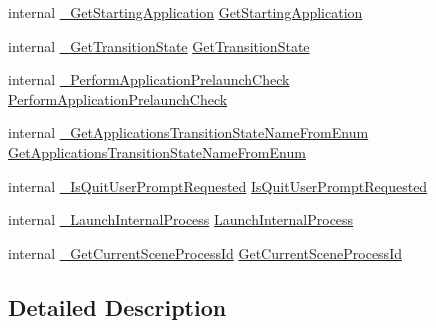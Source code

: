\begin{DoxyCompactItemize}
\item 
internal \mbox{\hyperlink{struct_valve_1_1_v_r_1_1_i_v_r_applications_a1eb7aeb6422c2a09ecf379532597cb05}{\+\_\+\+Get\+Starting\+Application}} \mbox{\hyperlink{struct_valve_1_1_v_r_1_1_i_v_r_applications_abd5f05be0ae3fb969f56ed2c054de4d8}{Get\+Starting\+Application}}
\item 
internal \mbox{\hyperlink{struct_valve_1_1_v_r_1_1_i_v_r_applications_a047619f84dbe4e1fc9faadd800669ac3}{\+\_\+\+Get\+Transition\+State}} \mbox{\hyperlink{struct_valve_1_1_v_r_1_1_i_v_r_applications_a05945f77ee67816eac9b62a4eba9a200}{Get\+Transition\+State}}
\item 
internal \mbox{\hyperlink{struct_valve_1_1_v_r_1_1_i_v_r_applications_af8f1a196897ce93933338eca85476b37}{\+\_\+\+Perform\+Application\+Prelaunch\+Check}} \mbox{\hyperlink{struct_valve_1_1_v_r_1_1_i_v_r_applications_a6692ff62e31050e0e639aedca5dfb342}{Perform\+Application\+Prelaunch\+Check}}
\item 
internal \mbox{\hyperlink{struct_valve_1_1_v_r_1_1_i_v_r_applications_a84090171964167a37149043d7834077b}{\+\_\+\+Get\+Applications\+Transition\+State\+Name\+From\+Enum}} \mbox{\hyperlink{struct_valve_1_1_v_r_1_1_i_v_r_applications_a7e6256dba191f4e0b7aa81093bffbff4}{Get\+Applications\+Transition\+State\+Name\+From\+Enum}}
\item 
internal \mbox{\hyperlink{struct_valve_1_1_v_r_1_1_i_v_r_applications_a76f4a8aeee6300e437459098141890b3}{\+\_\+\+Is\+Quit\+User\+Prompt\+Requested}} \mbox{\hyperlink{struct_valve_1_1_v_r_1_1_i_v_r_applications_ae0ffc02e21a7703c65e6c0d0483bd236}{Is\+Quit\+User\+Prompt\+Requested}}
\item 
internal \mbox{\hyperlink{struct_valve_1_1_v_r_1_1_i_v_r_applications_a298a348612023308adffef70f09fba4d}{\+\_\+\+Launch\+Internal\+Process}} \mbox{\hyperlink{struct_valve_1_1_v_r_1_1_i_v_r_applications_adddcaf2d617dbfd32439bb3c2fc3c3f1}{Launch\+Internal\+Process}}
\item 
internal \mbox{\hyperlink{struct_valve_1_1_v_r_1_1_i_v_r_applications_a2d37b2fc76a95f568513ca91e7baf553}{\+\_\+\+Get\+Current\+Scene\+Process\+Id}} \mbox{\hyperlink{struct_valve_1_1_v_r_1_1_i_v_r_applications_a0c5c557e5237c19ae592c67bbff10fd0}{Get\+Current\+Scene\+Process\+Id}}
\end{DoxyCompactItemize}


\subsection{Detailed Description}


